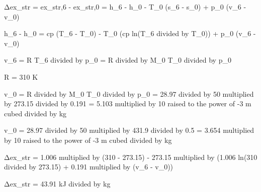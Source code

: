 Δex_str = ex_str,6 - ex_str,0 = h_6 - h_0 - T_0 (s_6 - s_0) + p_0 (v_6 - v_0)  

h_6 - h_0 = cp (T_6 - T_0) - T_0 (cp ln(T_6 divided by T_0)) + p_0 (v_6 - v_0)  

v_6 = R T_6 divided by p_0 = R divided by M_0 T_0 divided by p_0  

R = 310 K  

v_0 = R divided by M_0 T_0 divided by p_0 = 28.97 divided by 50 multiplied by 273.15 divided by 0.191 = 5.103 multiplied by 10 raised to the power of -3 m cubed divided by kg  

v_0 = 28.97 divided by 50 multiplied by 431.9 divided by 0.5 = 3.654 multiplied by 10 raised to the power of -3 m cubed divided by kg  

Δex_str = 1.006 multiplied by (310 - 273.15) - 273.15 multiplied by (1.006 ln(310 divided by 273.15) + 0.191 multiplied by (v_6 - v_0))  

Δex_str = 43.91 kJ divided by kg